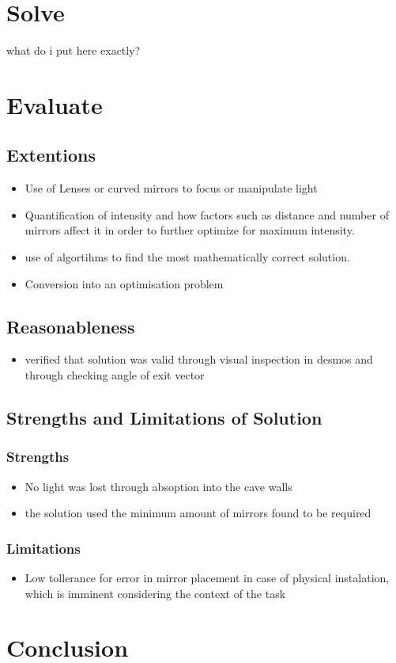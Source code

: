 \documentclass[11pt, letterpaper]{article}
\begin{document}
\par 


\section{Solve}

\par 
what do i put here exactly?

\section{Evaluate}



\subsection{Extentions}
\begin{itemize}
\item Use of Lenses	or curved mirrors to focus or manipulate light 
\item Quantification of intensity and how factors such as distance and number of mirrors affect it in order to further optimize for maximum intensity. 
\item use of algortihms to find the most mathematically correct solution.
\item Conversion into an optimisation problem
	
\end{itemize}



\subsection{Reasonableness}
\begin{itemize}
\item verified that solution was valid through visual inspection in desmos and through checking angle of exit vector
\end{itemize}

\subsection{Strengths and Limitations of Solution}
\subsubsection{Strengths}
\begin{itemize}
\item No light was lost through absoption into the cave walls
\item the solution used the minimum amount of mirrors found to be required
\end{itemize}
\subsubsection{Limitations}
\begin{itemize}


\item Low tollerance for error in mirror placement in case of physical instalation, which is imminent considering the context of the task
\end{itemize}
\section{Conclusion}


 
\end{document}
